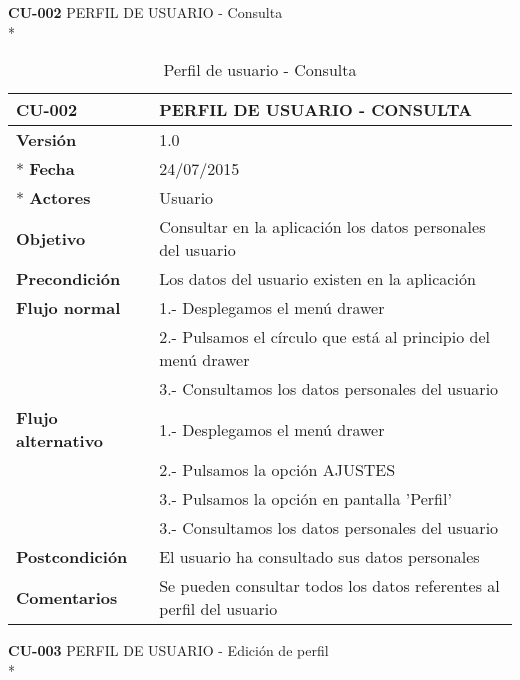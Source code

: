 \documentclass[../pfc.tex]{subfiles}
\begin{document}
	\textbf{CU-002}	PERFIL DE USUARIO - Consulta\\*
	
	\begin{table}[H]
		\centering
		\begin{tabular}[t]{|p{3cm}|p{9.5cm}|}
			\hline \textbf{CU-002} & \textbf{PERFIL DE USUARIO - CONSULTA} \\*
			\hline\hline \textbf{Versión} & 1.0 \\ *
			\hline\hline \textbf{Fecha} & 24/07/2015 \\ *
			\hline\textbf{Actores} 	& Usuario\\*
			\hline \textbf{Objetivo} & Consultar en la aplicación los datos personales del usuario\\* 			
			\hline \textbf{Precondición} & Los datos del usuario existen en la aplicación \\* 
			\hline \textbf{Flujo normal} & 1.- Desplegamos el menú drawer\\* 
			& 2.- Pulsamos el círculo que está al principio del menú drawer\\*	
			& 3.- Consultamos los datos personales del usuario\\*	
			\hline \textbf{Flujo alternativo} & 1.- Desplegamos el menú drawer\\* 
			& 2.- Pulsamos la opción AJUSTES \\*	
			& 3.- Pulsamos la opción en pantalla 'Perfil' \\*	
			& 3.- Consultamos los datos personales del usuario \\*	
			\hline \textbf{Postcondición} & El usuario ha consultado sus datos personales\\* 
			\hline \textbf{Comentarios}   & Se pueden consultar todos los datos referentes al perfil del usuario\\*
			\hline
		\end{tabular}
		\caption{Perfil de usuario - Consulta}
		\label{tabla:caso002}
	\end{table}
	
	\textbf{CU-003} PERFIL DE USUARIO - Edición de perfil\\*
	
\end{document}
